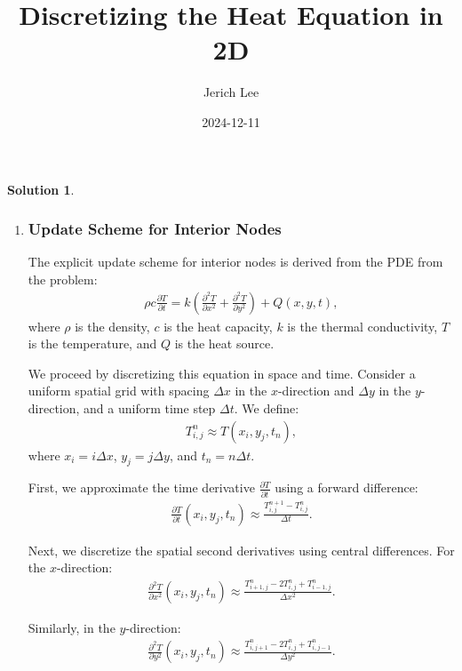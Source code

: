 \documentclass[12pt]{article}
\title{Discretizing the Heat Equation in 2D}
\author{Jerich Lee}
\date{2024-12-11}
\theoremstyle{definition} %
\newtheorem{solution}{Solution}
\theoremstyle{plain} %
\begin{document}
\maketitle


\begin{solution}

    \begin{enumerate}
        \item \subsubsection*{Update Scheme for Interior Nodes}

        The explicit update scheme for interior nodes is derived from the PDE from the problem:
        \begin{align}
        \rho c \frac{\partial T}{\partial t} = k \left( \frac{\partial^2 T}{\partial x^2} + \frac{\partial^2 T}{\partial y^2} \right) + Q(x, y, t),
        \end{align}
        where $\rho$ is the density, $c$ is the heat capacity, $k$ is the thermal conductivity, $T$ is the temperature, and $Q$ is the heat source.
        
         We proceed by discretizing this equation in space and time. Consider a uniform spatial grid with spacing $\Delta x$ in the $x$-direction and $\Delta y$ in the $y$-direction, and a uniform time step $\Delta t$. We define:
        \begin{align}
        T_{i,j}^n \approx T(x_i, y_j, t_n),
        \end{align}
        where $x_i = i \Delta x$, $y_j = j \Delta y$, and $t_n = n \Delta t$.
        
         First, we approximate the time derivative $\frac{\partial T}{\partial t}$ using a forward difference:
        \begin{align}
        \frac{\partial T}{\partial t}(x_i, y_j, t_n) \approx \frac{T_{i,j}^{n+1} - T_{i,j}^n}{\Delta t}.
        \end{align}
        
         Next, we discretize the spatial second derivatives using central differences. For the $x$-direction:
        \begin{align}
        \frac{\partial^2 T}{\partial x^2}(x_i, y_j, t_n) \approx \frac{T_{i+1,j}^n - 2T_{i,j}^n + T_{i-1,j}^n}{\Delta x^2}.
        \end{align}
        
         Similarly, in the $y$-direction:
        \begin{align}
        \frac{\partial^2 T}{\partial y^2}(x_i, y_j, t_n) \approx \frac{T_{i,j+1}^n - 2T_{i,j}^n + T_{i,j-1}^n}{\Delta y^2}.
        \end{align}
        

\end{enumerate}
\end{solution}
\end{document}

